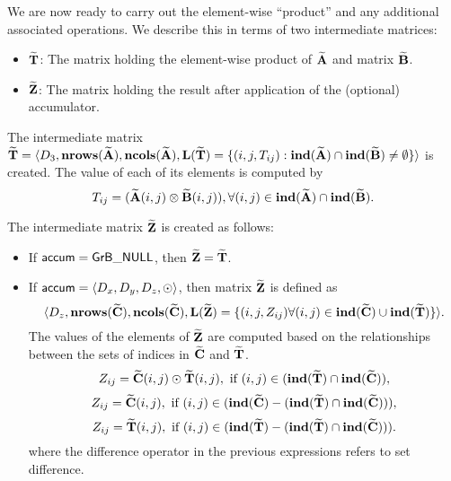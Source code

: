We are now ready to carry out the element-wise ``product'' and any additional 
associated operations.  We describe this in terms of two intermediate matrices:
\begin{itemize}
	\item ${\bf \widetilde{T}}$: The matrix holding the element-wise product of
    ${\bf \widetilde{A}}$ and matrix ${\bf \widetilde{B}}$.
	\item ${\bf \widetilde{Z}}$: The matrix holding the result after 
    application of the (optional) accumulator.
\end{itemize}

The intermediate matrix ${\bf \widetilde{T}} = \langle
D_3, \bold{nrows}({\bf \widetilde{A}}), \bold{ncols}({\bf \widetilde{A}}),
\bold{L}({\bf \widetilde{T}}) =
\{(i,j,T_{ij}) : \bold{ind}({\bf \widetilde{A}}) \cap 
\bold{ind}({\bf \widetilde{B}})
 \neq \emptyset \} \rangle$
is created.  The value of each of its elements is computed by 
\[T_{ij} = ({\bf \widetilde{A}}(i,j)
\otimes {\bf \widetilde{B}}(i,j)), \forall (i,j) \in 
\bold{ind}({\bf \widetilde{A}}) \cap 
\bold{ind}({\bf \widetilde{B}}).\]

The intermediate matrix ${\bf \widetilde{Z}}$ is created as follows:
\begin{itemize}
    \item If ${\sf accum} = {\sf GrB\_NULL}$, then ${\bf \widetilde{Z}} = {\bf \widetilde{T}}$.

    \item If ${\sf accum} = \langle D_x, D_y, D_z, \odot \rangle$, then matrix ${\bf \widetilde{Z}}$ is defined as 
        \[ \langle D_z, \bold{nrows}({\bf \widetilde{C}}), \bold{ncols}({\bf \widetilde{C}}), \bold{L}({\bf \widetilde{Z}})
		= \{(i,j,Z_{ij})  \forall (i,j) \in \bold{ind}({\bf \widetilde{C}}) \cup 
        \bold{ind}({\bf \widetilde{T}}) \} \rangle.\]
    The values of the elements of ${\bf \widetilde{Z}}$ are computed based on the 
    relationships between the sets of indices in ${\bf \widetilde{C}}$ and 
    ${\bf \widetilde{T}}$.
\[
Z_{ij} = {\bf \widetilde{C}}(i,j) \odot {\bf \widetilde{T}}(i,j), \ \mbox{if}\  (i,j) \in  (\bold{ind}({\bf \widetilde{T}}) \cap \bold{ind}({\bf \widetilde{C}})),
\]
\[
Z_{ij} = \matrix{\widetilde{C}}(i,j), \ \mbox{if}\  (i,j) \in  (\bold{ind}(\matrix{\widetilde{C}}) - (\bold{ind}(\matrix{\widetilde{T}}) \cap \bold{ind}(\matrix{\widetilde{C}}))),
\]
\[
Z_{ij} = \matrix{\widetilde{T}}(i,j), \ \mbox{if}\  (i,j) \in  (\bold{ind}(\matrix{\widetilde{T}}) - (\bold{ind}(\matrix{\widetilde{T}}) \cap \bold{ind}(\matrix{\widetilde{C}}))).
\]
where the difference operator in the previous expressions refers to set difference.
\end{itemize}

